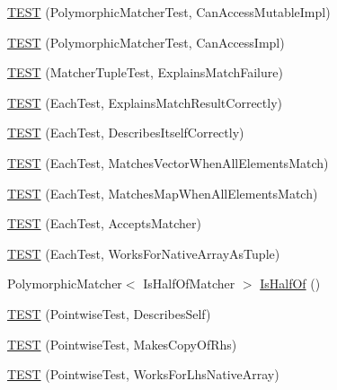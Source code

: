 \begin{DoxyCompactItemize}
\item 
\mbox{\hyperlink{namespacetesting_1_1gmock__matchers__test_ae29925e94a9396fe3c7fab6efaff8d8a}{T\+E\+ST}} (Polymorphic\+Matcher\+Test, Can\+Access\+Mutable\+Impl)
\item 
\mbox{\hyperlink{namespacetesting_1_1gmock__matchers__test_a918a64c4594ef6b30f53d735c2e6e6ac}{T\+E\+ST}} (Polymorphic\+Matcher\+Test, Can\+Access\+Impl)
\item 
\mbox{\hyperlink{namespacetesting_1_1gmock__matchers__test_abc9816afa3c83fc92e2c6ecfb2dd8e63}{T\+E\+ST}} (Matcher\+Tuple\+Test, Explains\+Match\+Failure)
\item 
\mbox{\hyperlink{namespacetesting_1_1gmock__matchers__test_adf46df588332aa839b52af952fface1a}{T\+E\+ST}} (Each\+Test, Explains\+Match\+Result\+Correctly)
\item 
\mbox{\hyperlink{namespacetesting_1_1gmock__matchers__test_a183c4b7acec060c6fe3dee650bc97e6d}{T\+E\+ST}} (Each\+Test, Describes\+Itself\+Correctly)
\item 
\mbox{\hyperlink{namespacetesting_1_1gmock__matchers__test_a1310e7e85bf8ea8f2281850167e15465}{T\+E\+ST}} (Each\+Test, Matches\+Vector\+When\+All\+Elements\+Match)
\item 
\mbox{\hyperlink{namespacetesting_1_1gmock__matchers__test_a53e7c1a04b8f178af52eeaa9f190cb64}{T\+E\+ST}} (Each\+Test, Matches\+Map\+When\+All\+Elements\+Match)
\item 
\mbox{\hyperlink{namespacetesting_1_1gmock__matchers__test_a74f7c802ddb6879d3c76ff08d3e242b9}{T\+E\+ST}} (Each\+Test, Accepts\+Matcher)
\item 
\mbox{\hyperlink{namespacetesting_1_1gmock__matchers__test_aef6eeafb03f698d16206836bbb6f05b9}{T\+E\+ST}} (Each\+Test, Works\+For\+Native\+Array\+As\+Tuple)
\item 
Polymorphic\+Matcher$<$ Is\+Half\+Of\+Matcher $>$ \mbox{\hyperlink{namespacetesting_1_1gmock__matchers__test_ace0a8f64b108c7a9c32c2cac15185461}{Is\+Half\+Of}} ()
\item 
\mbox{\hyperlink{namespacetesting_1_1gmock__matchers__test_a2c4c39058405e13e6c6b7fcf8e6bfe43}{T\+E\+ST}} (Pointwise\+Test, Describes\+Self)
\item 
\mbox{\hyperlink{namespacetesting_1_1gmock__matchers__test_a9be60ebc74e280d7eb6668bfa316a765}{T\+E\+ST}} (Pointwise\+Test, Makes\+Copy\+Of\+Rhs)
\item 
\mbox{\hyperlink{namespacetesting_1_1gmock__matchers__test_ad0e797104a482eba2d6c137cf9b676a5}{T\+E\+ST}} (Pointwise\+Test, Works\+For\+Lhs\+Native\+Array)
\item 

\end{DoxyCompactItemize}
